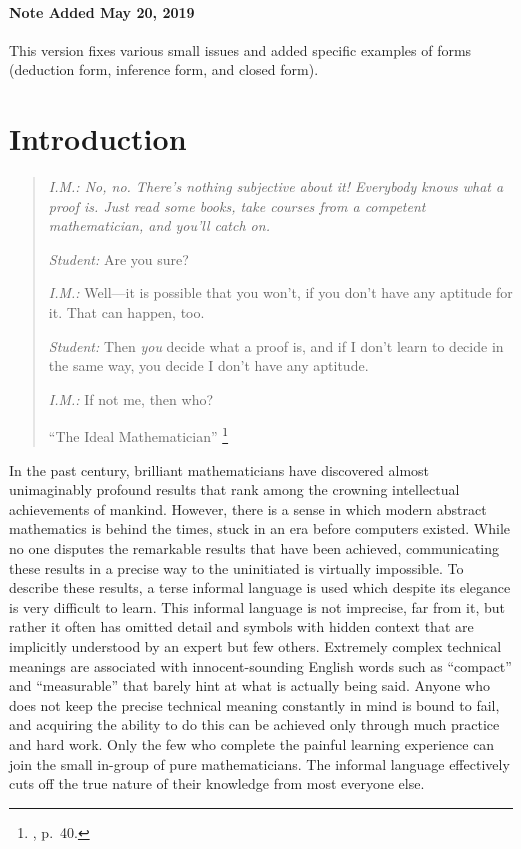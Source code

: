 \subsubsection{Note Added May 20, 2019}\label{note201905}

This version fixes various small issues and added specific examples
of forms (deduction form, inference form, and closed form).

\chapter{Introduction}

\begin{quotation}
  {\em {\em I.M.:}  No, no.  There's nothing subjective about it!  Everybody
knows what a proof is.  Just read some books, take courses from a competent
mathematician, and you'll catch on.

{\em Student:}  Are you sure?

{\em I.M.:}  Well---it is possible that you won't, if you don't have any
aptitude for it.  That can happen, too.

{\em Student:}  Then {\em you} decide what a proof is, and if I don't learn
to decide in the same way, you decide I don't have any aptitude.

{\em I.M.:}  If not me, then who?}
    \flushright\sc  ``The Ideal Mathematician''
    \footnote{\cite{Davis}, p.~40.}\\
\end{quotation}

In the past century, brilliant mathematicians have discovered almost
unimaginably profound results that rank among the crowning intellectual
achievements of mankind.  However, there is a sense in which modern abstract
mathematics is behind the times, stuck in an era before computers existed.
While no one disputes the remarkable results that have been achieved,
communicating these results in a precise way to the uninitiated is virtually
impossible.  To describe these results, a terse informal language is used which
despite its elegance is very difficult to learn.  This informal language is not
imprecise, far from it, but rather it often has omitted detail
and symbols with hidden context that are
implicitly understood by an expert but few others.  Extremely complex technical
meanings are associated with innocent-sounding English words such as
``compact'' and ``measurable'' that barely hint at what is actually being
said.  Anyone who does not keep the precise technical meaning constantly in
mind is bound to fail, and acquiring the ability to do this can be achieved
only through much practice and hard work.  Only the few who complete the
painful learning experience can join the small in-group of pure
mathematicians.  The informal language effectively cuts off the true nature of
their knowledge from most everyone else.

